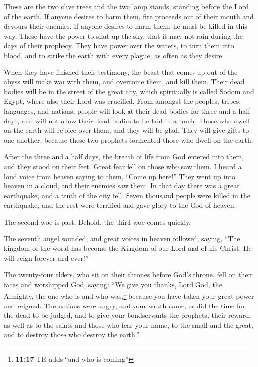  These are the two olive trees and the two lamp stands,
standing before the Lord of the earth.  If anyone desires
to harm them, fire proceeds out of their mouth and devours their
enemies. If anyone desires to harm them, he must be killed in this way.
 These have the power to shut up the sky, that it may not
rain during the days of their prophecy. They have power over the waters,
to turn them into blood, and to strike the earth with every plague, as
often as they desire.

 When they have finished their testimony, the beast that
comes up out of the abyss will make war with them, and overcome them,
and kill them.  Their dead bodies will be in the street of
the great city, which spiritually is called Sodom and Egypt, where also
their Lord was crucified.  From amongst the peoples,
tribes, languages, and nations, people will look at their dead bodies
for three and a half days, and will not allow their dead bodies to be
laid in a tomb.  Those who dwell on the earth will
rejoice over them, and they will be glad. They will give gifts to one
another, because these two prophets tormented those who dwell on the
earth.

 After the three and a half days, the breath of life from
God entered into them, and they stood on their feet. Great fear fell on
those who saw them.  I heard a loud voice from heaven
saying to them, ``Come up here!'' They went up into heaven in a cloud,
and their enemies saw them.  In that day there was a
great earthquake, and a tenth of the city fell. Seven thousand people
were killed in the earthquake, and the rest were terrified and gave
glory to the God of heaven.

 The second woe is past. Behold, the third woe comes
quickly.

 The seventh angel sounded, and great voices in heaven
followed, saying, ``The kingdom of the world has become the Kingdom of
our Lord and of his Christ. He will reign forever and ever!''

 The twenty-four elders, who sit on their thrones before
God's throne, fell on their faces and worshipped God, 
saying: ``We give you thanks, Lord God, the Almighty, the one who is and
who was,\footnote{\textbf{11:17} TR adds ``and who is coming''} because
you have taken your great power and reigned.  The nations
were angry, and your wrath came, as did the time for the dead to be
judged, and to give your bondservants the prophets, their reward, as
well as to the saints and those who fear your name, to the small and the
great, and to destroy those who destroy the earth.''


